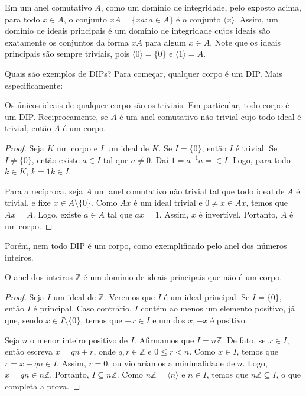 Em um anel comutativo $A$, como um domínio de integridade, pelo exposto acima, para todo $x \in A$, o conjunto $xA=\{xa: a \in A\}$ é o conjunto $\langle x\rangle$.
Assim, um domínio de ideais principais é um domínio de integridade cujos ideais são exatamente os conjuntos da forma $xA$ para algum $x \in A$. Note que os ideais principais são sempre triviais, pois $\langle 0\rangle=\{0\}$ e $\langle 1\rangle = A$.

Quais são exemplos de DIPs? Para começar, qualquer corpo é um DIP. Mais especificamente:

\begin{prop}
    Os únicos ideais de qualquer corpo são os triviais.
    Em particular, todo corpo é um DIP.
    Reciprocamente, se $A$ é um anel comutativo não trivial cujo todo ideal é trivial, então $A$ é um corpo.
\end{prop}
\begin{proof}
    Seja $K$ um corpo e $I$ um ideal de $K$.
    Se $I=\{0\}$, então $I$ é trivial.
    Se $I\neq \{0\}$, então existe $a \in I$ tal que $a \neq 0$. Daí $1=a^{-1}a=\in I$.
    Logo, para todo $k \in K$, $k=1k\in I$.

    Para a recíproca, seja $A$ um anel comutativo não trivial tal que todo ideal de $A$ é trivial, e fixe $x \in A\setminus \{0\}$.
    Como $Ax$ é um ideal trivial e $0\neq x \in Ax$, temos que $Ax=A$.
    Logo, existe $a \in A$ tal que $ax=1$. Assim, $x$ é invertível.
    Portanto, $A$ é um corpo.
\end{proof}

Porém, nem todo DIP é um corpo, como exemplificado pelo anel dos números inteiros.

\begin{prop} O anel dos inteiros $\mathbb Z$ é um domínio de ideais principais que não é um corpo.
\end{prop}
\begin{proof}
    Seja $I$ um ideal de $\mathbb Z$.
    Veremos que $I$ é um ideal principal.
    Se $I=\{0\}$, então $I$ é principal.
    Caso contrário, $I$ contém ao menos um elemento positivo, já que, sendo $x\in I\setminus\{0\}$, temos que $-x \in I$ e um dos $x, -x$ é positivo.

    Seja $n$ o menor inteiro positivo de $I$.
    Afirmamos que $I=n\mathbb Z$.
    De fato, se $x \in I$, então escreva $x=qn+r$, onde $q,r \in \mathbb Z$ e $0\leq r<n$.
    Como $x \in I$, temos que $r=x-qn \in I$. Assim, $r=0$, ou violaríamos a minimalidade de $n$.
    Logo, $x=qn\in n\mathbb Z$.
    Portanto, $I\subseteq n\mathbb Z$.
    Como $n\mathbb Z=\langle n\rangle$ e $n \in I$, temos que $n\mathbb Z\subseteq I$, o que completa a prova.
\end{proof}

